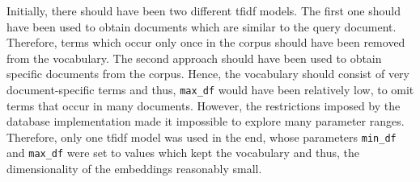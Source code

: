Initially, there should have been two different \ac{tfidf} models.
The first one should have been used to obtain documents which are similar to the query document.
Therefore, terms which occur only once in the corpus should have been removed from the vocabulary.
The second approach should have been used to obtain specific documents from the corpus.
Hence, the vocabulary should consist of very document-specific terms and thus, \texttt{max\_df} would have been relatively low, to omit terms that occur in many documents.
However, the restrictions imposed by the database implementation made it impossible to explore many parameter ranges.
Therefore, only one \ac{tfidf} model was used in the end, whose parameters \texttt{min\_df} and \texttt{max\_df} were set to values which kept the vocabulary and thus,
the dimensionality of the embeddings reasonably small.